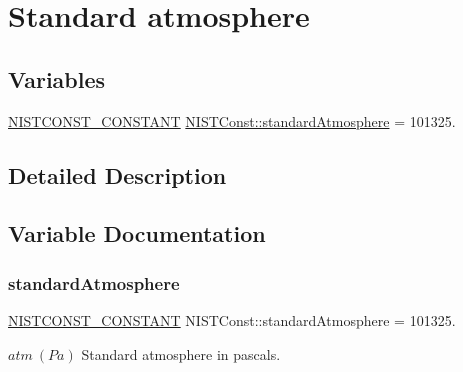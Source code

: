 \hypertarget{group___n_i_s_t_const-_standard_atmosphere}{}\section{Standard atmosphere}
\label{group___n_i_s_t_const-_standard_atmosphere}
\subsection*{Variables}
\begin{DoxyCompactItemize}
\item 
\mbox{\hyperlink{group___n_i_s_t_const-_macros_ga2b0fc1d7452373f816175dd86ce26729}{N\+I\+S\+T\+C\+O\+N\+S\+T\+\_\+\+C\+O\+N\+S\+T\+A\+NT}} \mbox{\hyperlink{group___n_i_s_t_const-_standard_atmosphere_ga6b5951b0dbdf131bb3138565e0828e79}{N\+I\+S\+T\+Const\+::standard\+Atmosphere}} = 101325.
\end{DoxyCompactItemize}


\subsection{Detailed Description}


\subsection{Variable Documentation}
\mbox{\label{group___n_i_s_t_const-_standard_atmosphere_ga6b5951b0dbdf131bb3138565e0828e79}} 
\subsubsection{\texorpdfstring{standard\+Atmosphere}{standardAtmosphere}}
{\footnotesize\ttfamily \mbox{\hyperlink{group___n_i_s_t_const-_macros_ga2b0fc1d7452373f816175dd86ce26729}{N\+I\+S\+T\+C\+O\+N\+S\+T\+\_\+\+C\+O\+N\+S\+T\+A\+NT}} N\+I\+S\+T\+Const\+::standard\+Atmosphere = 101325.}

$atm \ (Pa)$ Standard atmosphere in pascals. 